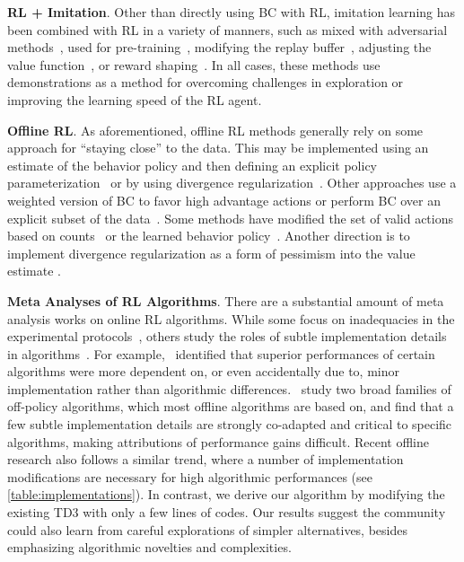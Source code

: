 \documentclass{article}
\begin{document}
\textbf{RL + Imitation}. Other than directly using BC with RL, imitation learning has been combined with RL in a variety of manners, such as mixed with adversarial methods~\citep{zhu2018reinforcement, kang2018policy}, used for pre-training~\citep{pfeiffer2018reinforced}, modifying the replay buffer~\citep{vevcerik2017leveraging, Gulcehre2020Making}, adjusting the value function~\citep{kim2013learning, hester2017deep}, or reward shaping~\citep{judah2014imitation, wu2021shaping}. In all cases, these methods use demonstrations as a method for overcoming challenges in exploration or improving the learning speed of the RL agent. 

\textbf{Offline RL}. As aforementioned, offline RL methods generally rely on some approach for ``staying close'' to the data. This may be implemented using an estimate of the behavior policy and then defining an explicit policy parameterization~\citep{fujimoto2018off, ghasemipour2020emaq}  or by using divergence regularization~\citep{jaques2019way, kumar2019stabilizing, wu2019behavior, Siegel2020Keep, guo2021batch, kostrikov2021offline}. Other approaches use a weighted version of BC to favor high advantage actions \citep{wang2018exponentially, peng2019advantage, Siegel2020Keep, wang2020critic, nair2020accelerating} or perform BC over an explicit subset of the data~\citep{chen2020bail}. Some methods have modified the set of valid actions based on counts~\citep{laroche2019safe} or the learned behavior policy~\citep{fujimoto2019benchmarking}. Another direction is to implement divergence regularization as a form of pessimism into the value estimate \citep{nachum2019algaedice, kumar2020conservative, buckman2020importance}.  


\textbf{Meta Analyses of RL Algorithms}. There are a substantial amount of meta analysis works on online RL algorithms. While some focus on inadequacies in the experimental protocols~\citep{henderson2017deep,osband2019behaviour}, others study the roles of subtle implementation details in algorithms~\citep{tucker18amirage,Engstrom2020Implementation,andrychowicz2021what,furuta2021identifying}. For example,~\citet{tucker18amirage,Engstrom2020Implementation} identified that superior performances of certain algorithms were more dependent on, or even accidentally due to, minor implementation rather than algorithmic differences.~\citet{furuta2021identifying} study two broad families of off-policy algorithms, which most offline algorithms are based on, and find that a few subtle implementation details are strongly co-adapted and critical to specific algorithms, making attributions of performance gains difficult. Recent offline research also follows a similar trend, where a number of implementation modifications are necessary for high algorithmic performances (see \autoref{table:implementations}). In contrast, we derive our algorithm by modifying the existing TD3 with only a few lines of codes. Our results suggest the community could also learn from careful explorations of simpler alternatives, besides emphasizing algorithmic novelties and complexities.
\end{document}
